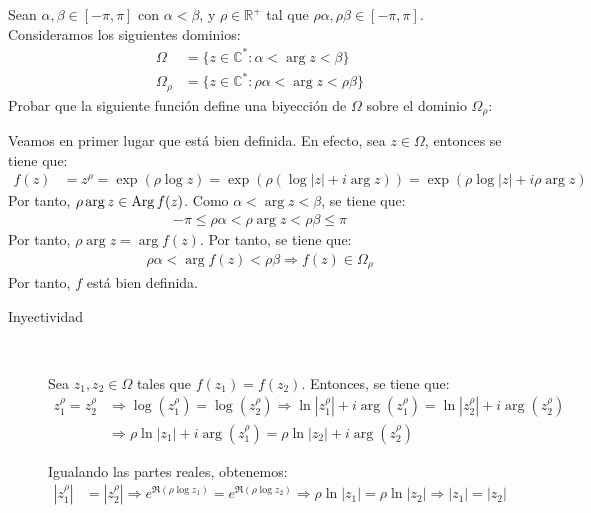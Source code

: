 \begin{ejercicio}
    Sean $\alpha,\beta \in \left[ -\pi, \pi \right]$ con $\alpha < \beta$, y $\rho \in \mathbb{R}^+$ tal que $\rho\alpha,\rho\beta \in \left[ -\pi, \pi \right]$. Consideramos los siguientes dominios:
    \begin{align*}
        \Omega &= \{z \in \mathbb{C}^* : \alpha < \arg z < \beta\} \\
        \Omega_\rho &= \{z \in \mathbb{C}^* : \rho\alpha < \arg z < \rho\beta\}
    \end{align*}
    Probar que la siguiente función define una biyección de $\Omega$ sobre el dominio $\Omega_\rho$:

    Veamos en primer lugar que está bien definida. En efecto, sea $z\in \Omega$, entonces se tiene que:
    \begin{align*}
        f(z) &= z^\rho = \exp(\rho\log z) = \exp\left(\rho\left(\log |z| + i\arg z\right)\right) = \exp\left(\rho\log |z| + i\rho\arg z\right)
    \end{align*}
    Por tanto, $\rho\arg z \in \operatorname{Arg} f(z)$. Como $\alpha < \arg z < \beta$, se tiene que:
    \begin{align*}
        -\pi\leq \rho\alpha < \rho\arg z < \rho\beta\leq \pi
    \end{align*}
    Por tanto, $\rho\arg z=\arg f(z)$. Por tanto, se tiene que:
    \begin{align*}
        \rho\alpha < \arg f(z) < \rho\beta
        \Longrightarrow f(z)\in \Omega_\rho
    \end{align*}
    Por tanto, $f$ está bien definida.
    \begin{description}
        \item[Inyectividad]~
        
        Sea $z_1,z_2\in \Omega$ tales que $f(z_1)=f(z_2)$. Entonces, se tiene que:
        \begin{align*}
            z_1^\rho = z_2^\rho &\Longrightarrow \log(z_1^\rho) = \log(z_2^\rho) \Longrightarrow \ln|z_1^\rho| + i\arg(z_1^\rho) = \ln|z_2^\rho| + i\arg(z_2^\rho)\\
            &\Longrightarrow \rho\ln|z_1| + i\arg(z_1^\rho) = \rho\ln|z_2| + i\arg(z_2^\rho)
        \end{align*}

        Igualando las partes reales, obtenemos:
        \begin{align*}
            |z_1^\rho| &= |z_2^\rho| \Longrightarrow e^{\Re(\rho\log z_1)} = e^{\Re(\rho\log z_2)} \Longrightarrow \rho\ln|z_1| = \rho\ln|z_2|\Longrightarrow |z_1| = |z_2|
        \end{align*}
        

\end{description}
\end{ejercicio}
